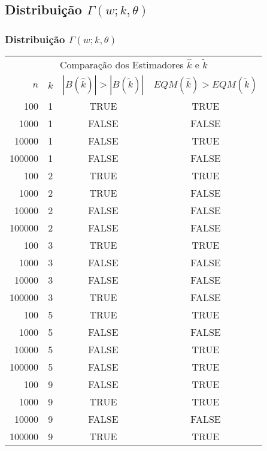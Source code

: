 \subsection{Distribuição  $\Gamma(w;k,\theta)$}

\begin{frame}
  \frametitle{Distribuição $\Gamma(w;k,\theta)$}
  \tiny
  \begin{table}[h]
    \label{tab:gamma_r_mv}
    \centering
    \begin{tabular}{rccc}
      \toprule
      \multicolumn{4}{c}{Comparação dos Estimadores $\hat{k}$ e $\tilde{k}$}\\
      $n$ & $k$ & $|B(\hat{k})|>|B(\tilde{k})|$ & $EQM(\hat{k})>EQM(\tilde{k})$ \\
      \midrule
      100 & 1 & TRUE & TRUE\\
      1000 & 1 & FALSE & FALSE\\
      10000 & 1 & FALSE & TRUE\\
      100000 & 1 & FALSE & FALSE\\
      100 & 2 & TRUE & TRUE\\
      1000 & 2 & TRUE & FALSE\\
      10000 & 2 & FALSE & FALSE\\
      100000 & 2 & FALSE & FALSE\\
      100 & 3 & TRUE & TRUE\\
      1000 & 3 & FALSE & FALSE\\
      10000 & 3 & FALSE & FALSE\\
      100000 & 3 & TRUE & FALSE\\
      100 & 5 & TRUE & TRUE\\
      1000 & 5 & FALSE & FALSE\\
      10000 & 5 & FALSE & TRUE\\
      100000 & 5 & FALSE & TRUE\\
      100 & 9 & FALSE & TRUE\\
      1000 & 9 & TRUE & TRUE\\
      10000 & 9 & FALSE & FALSE\\
      100000 & 9 & TRUE & TRUE\\
      \bottomrule
    \end{tabular}
  \end{table}
\end{frame}

